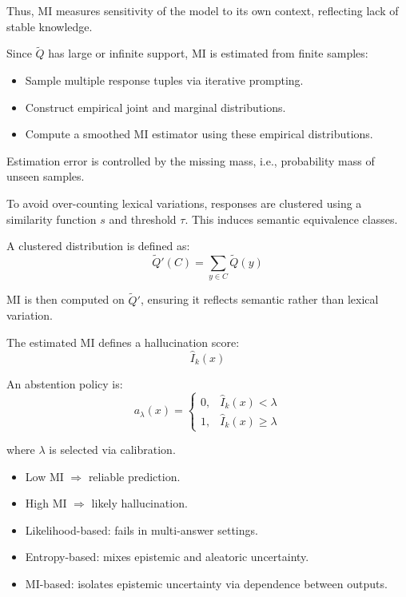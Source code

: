 Thus, MI measures sensitivity of the model to its own context, reflecting lack of stable knowledge.


Since $\widetilde Q$ has large or infinite support, MI is estimated from finite samples:
\begin{itemize}
    \item Sample multiple response tuples via iterative prompting.
    \item Construct empirical joint and marginal distributions.
    \item Compute a smoothed MI estimator using these empirical distributions.
\end{itemize}

Estimation error is controlled by the missing mass, i.e., probability mass of unseen samples.


To avoid over-counting lexical variations, responses are clustered using a similarity function $s$ and threshold $\tau$. This induces semantic equivalence classes.

A clustered distribution is defined as:
\[
\widetilde Q'(C) = \sum_{y \in C} \widetilde Q(y)
\]

MI is then computed on $\widetilde Q'$, ensuring it reflects semantic rather than lexical variation.


The estimated MI defines a hallucination score:
\[
\widehat I_k(x)
\]

An abstention policy is:
\[
a_\lambda(x) =
\begin{cases}
0, & \widehat I_k(x) < \lambda \\
1, & \widehat I_k(x) \ge \lambda
\end{cases}
\]

where $\lambda$ is selected via calibration.

\begin{itemize}
    \item Low MI $\Rightarrow$ reliable prediction.
    \item High MI $\Rightarrow$ likely hallucination.
\end{itemize}


\begin{itemize}
    \item Likelihood-based: fails in multi-answer settings.
    \item Entropy-based: mixes epistemic and aleatoric uncertainty.
    \item MI-based: isolates epistemic uncertainty via dependence between outputs.
\end{itemize}

